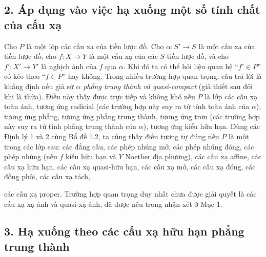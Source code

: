 \subsection*{2. Áp dụng vào việc hạ xuống một số tính chất của cấu xạ}

Cho $P$ là một lớp các cấu xạ của tiền lược đồ. Cho
$\alpha:S'\longrightarrow S$ là một cấu xạ của tiền lược đồ, cho
$f:X\longrightarrow Y$ là một cấu xạ của các $S$-tiền lược đồ, và cho
$f':X'\longrightarrow Y'$ là nghịch ảnh của $f$ qua $\alpha$. Khi đó ta có thể
hỏi liệu quan hệ ``$f'\in P$'' có kéo theo ``$f\in P$'' hay không. Trong nhiều
trường hợp quan trọng, câu trả lời là khẳng định nếu giả sử $\alpha$
\emph{phẳng trung thành và quasi-compact} (giả thiết sau đôi khi là thừa). Điều
này thấy được trực tiếp và không khó nếu $P$ là lớp các cấu xạ toàn ánh, tương
ứng radicial (các trường hợp này suy ra từ tính toàn ánh của $\alpha$), tương
ứng phẳng, tương ứng phẳng trung thành, tương ứng trơn (các trường hợp này suy
ra từ tính phẳng trung thành của $\alpha$), tương ứng kiểu hữu hạn. Dùng các
Định lý 1 và 2 cùng Bổ đề 1.2, ta cũng thấy điều tương tự đúng nếu $P$ là một
trong các lớp sau: các đẳng cấu, các phép nhúng mở, các phép nhúng đóng, các
phép nhúng (nếu $f$ kiểu hữu hạn và $Y$ Noether địa phương), các cấu xạ affine,
các cấu xạ hữu hạn, các cấu xạ quasi-hữu hạn, các cấu xạ mở, các cấu xạ đóng,
các đồng phôi, các cấu xạ tách,

các cấu xạ proper. Trường hợp quan trọng duy nhất chưa được giải quyết là các
cấu xạ xạ ảnh và quasi-xạ ảnh, đã được nêu trong nhận xét ở Mục 1.

\subsection*{3. Hạ xuống theo các cấu xạ hữu hạn phẳng trung thành}

